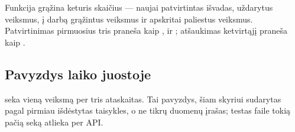 Funkcija grąžina keturis skaičius --- naujai patvirtintas išvadas, uždarytus veiksmus, į darbą
grąžintus veiksmus ir apskritai paliestus veiksmus. Patvirtinimas pirmuosius tris praneša kaip
,  ir ; atšaukimas ketvirtąjį praneša kaip
.

\subsection{Pavyzdys laiko juostoje}

 seka vieną veiksmą per tris ataskaitas. Tai pavyzdys, šiam skyriui
sudarytas pagal pirmiau išdėstytas taisykles, o ne tikrų duomenų įrašas; testas
 faile  tokią pačią
seką atlieka per API.

